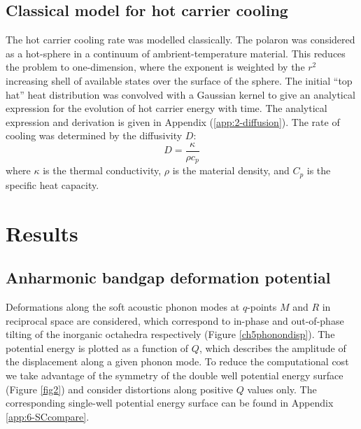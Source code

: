 \subsection{Classical model for hot carrier cooling}
The hot carrier cooling rate was modelled classically. The polaron was considered as a hot-sphere in a continuum of ambrient-temperature material. This reduces the problem to one-dimension, where the exponent is weighted by the $r^2$ increasing shell of available states over the surface of the sphere. 
The initial “top hat” heat distribution was convolved with a Gaussian kernel to give an analytical expression for the evolution of hot carrier energy with time. The analytical expression and derivation is given in Appendix (\ref{app:2-diffusion}).
The rate of cooling was determined by the diffusivity $D$:
\begin{equation}
    D = \frac{\kappa}{\rho c_p}
\end{equation}
where $\kappa$ is the thermal conductivity, $\rho$ is the material density, and $C_p$ is the specific heat capacity.

\section{Results}
\subsection{Anharmonic bandgap deformation potential} \label{ch5bdp}
Deformations along the soft acoustic phonon modes at $q$-points $M$ and $R$ in reciprocal space are considered, which correspond to in-phase and out-of-phase tilting of the inorganic octahedra respectively (Figure \ref{ch5phonondisp}).
The potential energy is plotted as a function of $Q$, which describes the amplitude of the displacement along a given phonon mode.\autocite{Whalley2016}
To reduce the computational cost we take advantage of the symmetry of the double well potential energy surface (Figure \ref{fig2}) and consider distortions along positive $Q$ values only. The corresponding single-well potential energy surface can be found in Appendix \ref{app:6-SCcompare}.

